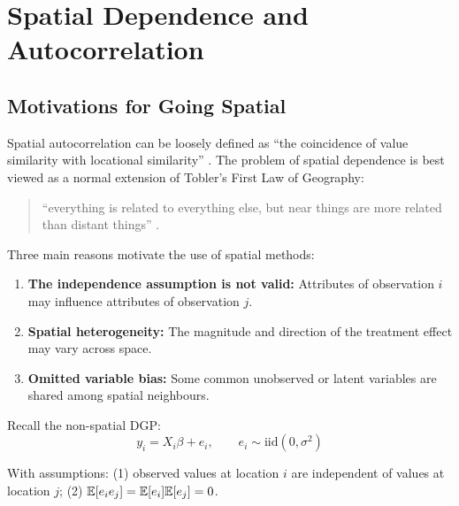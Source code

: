 
\chapter{Spatial Dependence and Autocorrelation}
\label{chap_Spatial}

\section{Motivations for Going Spatial}
\label{sec_MotivationsSpatial}

Spatial autocorrelation can be loosely defined
as ``the coincidence of value similarity with locational similarity''
\citep{Anselin2002}. The problem of spatial dependence is best viewed as a
normal extension of Tobler's First Law of Geography:

\begin{quote}
``everything is related to everything else, but near things are more related
than distant things'' \citep[p.236]{Tobler1970}.
\end{quote}

Three main reasons motivate the use of spatial methods:

\begin{enumerate}[label=(\roman*)]
  \item \textbf{The independence assumption is not valid:} Attributes of
    observation $i$ may influence attributes of observation $j$.
  \item \textbf{Spatial heterogeneity:} The magnitude and direction of the
    treatment effect may vary across space.
  \item \textbf{Omitted variable bias:} Some common unobserved or latent
    variables are shared among spatial neighbours.
\end{enumerate}

Recall the non-spatial DGP:
\begin{equation}
  y_i = X_i\beta + e_i, \qquad e_i \sim \text{iid}(0,\sigma^2)
  \label{eq_NonSpatDGP}
\end{equation}

With assumptions: (1) observed values at location $i$ are independent of
values at location $j$; (2) $\mathbb{E}[e_ie_j] = \mathbb{E}[e_i]\mathbb{E}[e_j] = 0$.

